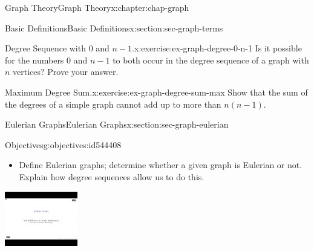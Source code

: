 \documentclass[oneside,10pt,]{book}
\numberwithin{equation}{section}
\newlength{\qrsize}
\newlength{\previewwidth}
\begin{document}
\begin{chapterptx}{Graph Theory}{}{Graph Theory}{}{}{x:chapter:chap-graph}
\begin{sectionptx}{Basic Definitions}{}{Basic Definitions}{}{}{x:section:sec-graph-terms}
\begin{inlineexercise}{Degree Sequence with 0 and \(n-1\).}{x:exercise:ex-graph-degree-0-n-1}%
Is it possible for the numbers \(0\) and \(n-1\) to both occur in the degree sequence of a graph with \(n\) vertices? Prove your answer.%
\end{inlineexercise}%
\begin{inlineexercise}{Maximum Degree Sum.}{x:exercise:ex-graph-degree-sum-max}%
Show that the sum of the degrees of a simple graph cannot add up to more than \(n(n-1)\).%
\end{inlineexercise}%
\end{sectionptx}
%
%
\typeout{************************************************}
\typeout{************************************************}
%
\begin{sectionptx}{Eulerian Graphs}{}{Eulerian Graphs}{}{}{x:section:sec-graph-eulerian}
\begin{objectives}{Objectives}{g:objectives:id544408}
%
\begin{itemize}[label=\textbullet]
\item{}Define Eulerian graphs; determine whether a given graph is Eulerian or not. Explain how degree sequences allow us to do this.%
\end{itemize}
\end{objectives}
\begin{sidebyside}{1}{0}{0}{0}%
\begin{sbspanel}{1}%
\setlength{\qrsize}{9em}
\setlength{\previewwidth}{\linewidth}
\addtolength{\previewwidth}{-\qrsize}
\begin{tcbraster}[raster columns=2, raster column skip=1pt, raster halign=center, raster force size=false, raster left skip=0pt, raster right skip=0pt]%
\begin{tcolorbox}[previewstyle, width=\previewwidth]%
\includegraphics[width=0.80\linewidth,height=\qrsize,keepaspectratio]{images/video-eulerian.jpg}%

\end{tcolorbox}
\end{tcbraster}
\end{sbspanel}
\end{sidebyside}
\end{sectionptx}
\end{chapterptx}
\end{document}
